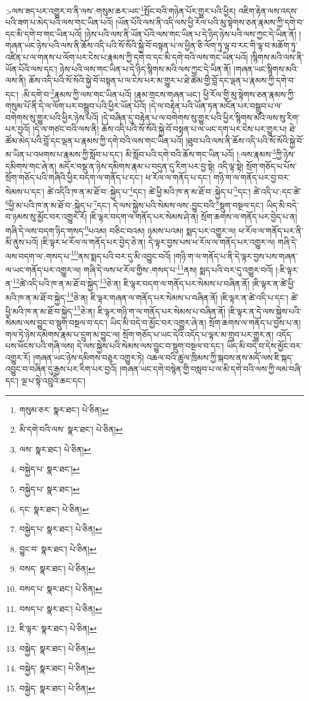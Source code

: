  >ལས་ཟད་པར་འགྱུར་བ་ནི་ལས་:གསུམ་ཆར་ཡང་\footnote{གསུམ་ཅར་  སྣར་ཐང་།  པེ་ཅིན། }སྤོང་བའི་གཉེན་པོར་གྱུར་པའི་ཕྱིར། འཇིག་རྟེན་ལས་འདས་པའི་ཟག་པ་མེད་པའི་ལས་གང་ཡིན་པའོ། །ཡོན་པོའི་ལས་ནི་འདི་ལས་ཕྱི་རོལ་པའི་མུ་སྟེགས་ཅན་རྣམས་ཀྱི་དགེ་བ་དང་མི་དགེ་བ་གང་ཡིན་པའོ། །ཉེས་པའི་ལས་ནི་ཡོན་པོའི་ལས་གང་ཡིན་པ་དེ་ཉིད་ཉེས་པའི་ལས་ཀྱང་དེ་ཡིན་ནོ། །གཞན་ཡང་ཉེས་པའི་ལས་ནི་ཆོས་འདི་པའི་སོ་སོའི་སྐྱེ་བོ་བསྟན་པ་ལ་ཕྱིན་ཅི་ལོག་ཏུ་ལྟ་བ་རང་གི་ལྟ་བ་མཆོག་ཏུ་འཛིན་པ་ལ་གནས་པ་ལོག་པར་ངེས་པ་རྣམས་ཀྱི་དགེ་བ་དང་མི་དགེ་བའི་ལས་གང་ཡིན་པའོ། །སྙིགས་མའི་ལས་ནི་ཡོན་པོའི་ལས་དང་། ཉེས་པའི་ལས་གང་ཡིན་པ་དེ་ཉིད་སྙིགས་མའི་ལས་ཀྱང་དེ་ཡིན་ནོ། །གཞན་ཡང་སྙིགས་མའི་ལས་ནི། ཆོས་འདི་པའི་སོ་སོའི་སྐྱེ་བོ་བསྟན་པ་ལ་ངེས་པར་མ་གྱུར་པ་ཐེ་ཚོམ་གྱི་བློ་དང་ལྡན་པ་རྣམས་ཀྱི་དགེ་བ་དང་། :མི་དགེ་བ་\footnote{མི་དགེ་བའི་ལས་  སྣར་ཐང་།  པེ་ཅིན། }རྣམས་ཀྱི་ལས་གང་ཡིན་པའོ། །རྣམ་གྲངས་གཞན་ཡང་། ཕྱི་རོལ་གྱི་མུ་སྟེགས་ཅན་རྣམས་ཀྱི་གསུམ་པོ་ནི་དེ་ལ་ལོག་པར་བསྒྲུབ་པའི་ཕྱིར་ཡོན་པོའོ། །དེ་ལ་བརྟེན་པའི་ཡོན་ཏན་མངོན་པར་བསྒྲུབ་པ་ལ་བགེགས་སུ་གྱུར་པའི་ཕྱིར་ཉེས་པའོ། །དེ་བཞིན་དུ་བརྟེན་པ་ལ་བགེགས་སུ་གྱུར་པའི་ཕྱིར་སྙིགས་མའི་ལས་སུ་རིག་པར་བྱའོ། །དེ་ལ་གཙང་བའི་ལས་ནི། ཆོས་འདི་པའི་སོ་སོའི་སྐྱེ་བོ་བསྟན་པ་ལ་ཡང་དག་པར་ངེས་པར་གྱུར་པ། ཐེ་ཚོམ་མེད་པའི་བློ་དང་ལྡན་པ་རྣམས་ཀྱི་དགེ་བའི་ལས་གང་ཡིན་པའོ། །ཐུབ་པའི་ལས་ནི་ཆོས་འདི་པའི་སོ་སོའི་སྐྱེ་བོ་མ་ཡིན་པ་འཕགས་པ་རྣམས་ཀྱི་སློབ་པ་དང་། མི་སློབ་པའི་དགེ་བའི་ཆོས་གང་ཡིན་པའོ། །:ལས་རྣམས་\footnote{ལས་  སྣར་ཐང་།  པེ་ཅིན། }ཀྱི་ཉེས་དམིགས་གང་ཞེ་ན། མདོར་བསྡུ་ན་ཉེས་དམིགས་རྣམ་པ་བདུན་དུ་རིག་པར་བྱ་སྟེ། འདི་ལྟ་སྟེ། སྲོག་གཅོད་པ་པོས་སྲོག་གཅོད་པའི་གཞིའི་ཕྱིར་བདག་ལ་གནོད་པ་དང་། ཕ་རོལ་ལ་གནོད་པ་དང་། གཉི་ག་ལ་གནོད་པར་བྱ་བར་སེམས་པ་དང་། ཚེ་འདིའི་ཁ་ན་མ་ཐོ་བ་:སྐྱེད་པ་\footnote{བསྐྱེད་པ་  སྣར་ཐང་། }དང་། ཚེ་ཕྱི་མའི་ཁ་ན་མ་ཐོ་བ་:སྐྱེད་པ་\footnote{བསྐྱེད་པ་  སྣར་ཐང་། }དང་། ཚེ་འདི་པ་:དང་ཚེ་\footnote{དང་  སྣར་ཐང་།  པེ་ཅིན། }ཕྱི་མ་པའི་ཁ་ན་མ་ཐོ་བ་:སྐྱེད་པ་\footnote{བསྐྱེད་པ་  སྣར་ཐང་།  པེ་ཅིན། }དང་། དེ་ལས་སྐྱེས་པའི་སེམས་ལས་:བྱུང་བའི་\footnote{བྱུང་བ་  སྣར་ཐང་།  པེ་ཅིན། }སྡུག་བསྔལ་དང་། ཡིད་མི་བདེ་བ་ཉམས་སུ་མྱོང་བར་འགྱུར་རོ། །ཇི་ལྟར་བདག་ལ་གནོད་པར་སེམས་ཤེ་ན། སྲོག་ཆགས་ལ་གནོད་པར་བྱེད་པ་ན། གཞི་དེ་ལས་བདག་ཉིད་གསད་\footnote{བསད་  སྣར་ཐང་།  པེ་ཅིན། }པའམ། བཅིང་བའམ། ཉམས་པའམ། སྨད་པར་འགྱུར་ལ། ཕ་རོལ་ལ་གནོད་པར་ནི་མི་ནུས་པའོ། །ཇི་ལྟར་ཕ་རོལ་ལ་གནོད་པར་བྱེད་ཅེ་ན། དེ་ལྟར་བྱས་པས་ཕ་རོལ་ལ་གནོད་པར་འགྱུར་ལ། གཞི་དེ་ལས་བདག་ལ་:གསད་པ་\footnote{བསད་པ་  སྣར་ཐང་།  པེ་ཅིན། }ནས་སྨད་པའི་བར་དུ་མི་འབྱུང་བའོ། །གཉི་ག་ལ་གནོད་པ་ནི་དེ་ལྟར་བྱས་པས་གཞན་ལ་ཡང་གནོད་པར་འགྱུར་ལ། གཞི་དེ་ལས་ཕ་རོལ་གྱིས་:གསད་པ་\footnote{བསད་པ་  སྣར་ཐང་།  པེ་ཅིན། }ནས། སྨད་པའི་བར་དུ་འགྱུར་བའོ། །:ཇི་ལྟར་ན་\footnote{ཇི་ལྟར་  སྣར་ཐང་།  པེ་ཅིན། }ཚེ་འདི་པའི་ཁ་ན་མ་ཐོ་བ་སྐྱེད་\footnote{བསྐྱེད་  སྣར་ཐང་།  པེ་ཅིན། }ཅེ་ན། ཇི་ལྟར་བདག་ལ་གནོད་པར་སེམས་པ་བཞིན་ནོ། །ཇི་ལྟར་ན་ཚེ་ཕྱི་མའི་ཁ་ན་མ་ཐོ་བ་སྐྱེད་\footnote{བསྐྱེད་  སྣར་ཐང་།  པེ་ཅིན། }ཅེ་ན། ཇི་ལྟར་གཞན་ལ་གནོད་པར་སེམས་པ་བཞིན་ནོ། །ཇི་ལྟར་ན་ཚེ་འདི་པ་དང་། ཚེ་ཕྱི་མའི་ཁ་ན་མ་ཐོ་བ་སྐྱེད་\footnote{བསྐྱེད་  སྣར་ཐང་།  པེ་ཅིན། }ཅེ་ན། ཇི་ལྟར་གཉི་ག་ལ་གནོད་པར་སེམས་པ་བཞིན་ནོ། །ཇི་ལྟར་ན་དེ་ལས་སྐྱེས་པའི་སེམས་ལས་བྱུང་བ་སྡུག་བསྔལ་བ་དང་། ཡིད་མི་བདེ་བ་མྱོང་བར་འགྱུར་ཞེ་ན། སྲོག་ཆགས་ལ་གནོད་པ་བྱས་པ་ན། གལ་ཏེ་ཉེས་དམིགས་རྣམ་པ་དྲུག་མ་བྱུང་ལ། སྲོག་གཅོད་པ་ཡང་དེའི་འདོད་པ་ལྟར་མ་གྲུབ་པར་གྱུར་ན། འདོད་པས་ཕོངས་པའི་གཞི་ལས། དེ་ལས་སྐྱེས་པའི་སེམས་ལས་བྱུང་བ་སྡུག་བསྔལ་བ་དང་། ཡིད་མི་བདེ་བ་དེས་མྱོང་བར་འགྱུར་རོ། །གཞན་ཡང་ཉེས་དམིགས་བཅུར་འགྱུར་ཏེ། འཆལ་བའི་ཚུལ་ཁྲིམས་ཀྱི་སྐབས་ནས་མདོ་ལས་ཇི་སྐད་འབྱུང་བ་བཞིན་དུ་རྒྱས་པར་རིག་པར་བྱའོ། །གཞན་ཡང་དགེ་བསྙེན་གྱི་བསླབ་པ་ལ་མི་དགེ་བའི་ལས་ཀྱི་ལམ་བཞི་དང་། ལྔ་པ་སྟེ་འབྲུའི་ཆང་དང་། 